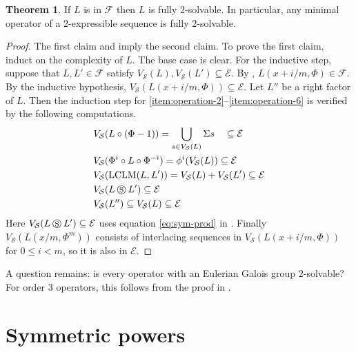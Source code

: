 \documentclass[11pt,reqno]{amsart}
\theoremstyle{definition}
\newtheorem{theorem}{Theorem}[section]
\DeclareMathOperator{\LCLM}{LCLM}
\newcommand{\cs}{\mathbin{\circledS}}
\begin{document}
\begin{theorem}\label{thm:fully-2-solvable}
     If $L$ is in $\mathcal{F}$ then $L$ is fully $2$-solvable. In particular, any minimal operator of a $2$-expressible sequence is fully $2$-solvable.
\end{theorem}
\begin{proof}
    The first claim and  imply the second claim.
    To prove the first claim, induct on the complexity of $L$. The base case is clear. 
    For the inductive step, suppose that $L,L'\in \mathcal{F}$ satisfy $V_{\mathcal{S}}(L),V_{\mathcal{S}}(L')\subseteq \mathcal{E}$.
    By , $L(x+i/m,\Phi)\in \mathcal{F}$. By the inductive hypothesis, $V_{\mathcal{S}}(L(x+i/m,\Phi))\subseteq \mathcal{E}$.
    Let $L''$ be a right factor of $L$. 
    Then the induction step for \ref{item:operation-2}--\ref{item:operation-6} is verified by the following computations.
    \begin{equation*}
        \begin{aligned}
            &V_{\mathcal{S}}(L\circ (\Phi-1))=\bigcup_{s\in V_{\mathcal{S}}(L)}\Sigma s \quad\subseteq \mathcal{E}\\
            &V_{\mathcal{S}}(\Phi^{i}\circ L\circ \Phi^{-i})=\phi^{i}(V_{\mathcal{S}}(L))\subseteq \mathcal{E}\\
            &V_{\mathcal{S}}(\LCLM(L,L'))=V_{\mathcal{S}}(L)+V_{\mathcal{S}}(L')\subseteq \mathcal{E}\\
            &V_{\mathcal{S}}(L\cs L') \subseteq \mathcal{E}\\
            &V_{\mathcal{S}}(L'')\subseteq V_{\mathcal{S}}(L)\subseteq \mathcal{E}\\
        \end{aligned}
    \end{equation*}
    Here $V_{\mathcal{S}}(L\cs L')\subseteq \mathcal{E}$ uses equation \eqref{eq:sym-prod} in .
    Finally $V_{\mathcal{S}}(L(x/m,\Phi^{m}))$ consists of interlacing sequences in $V_{\mathcal{S}}(L(x+i/m,\Phi))$ for $0\le i<m$, so it is also in $\mathcal{E}$.
\end{proof}

A question remains: is every operator with an Eulerian Galois group $2$-solvable? For order $3$ operators, this follows from the proof in .

\section{Symmetric powers}
\label{section:symmetric-powers}
\end{document}
